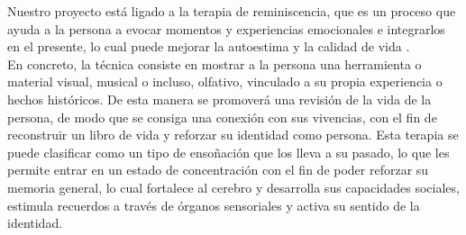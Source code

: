 Nuestro proyecto está ligado a la terapia de reminiscencia, que es un proceso que ayuda a la persona a evocar momentos y experiencias emocionales e integrarlos en el presente, lo cual puede mejorar la autoestima y la calidad de vida \citep{gonzalez2015terapia}.\\

En concreto, la técnica consiste en mostrar a la persona una herramienta o material visual, musical o incluso, olfativo, vinculado a su propia experiencia o hechos históricos. De esta manera se promoverá una revisión de la vida de la persona, de modo que se consiga una conexión con sus vivencias, con el fin de reconstruir un libro de vida y reforzar su identidad como persona.  Esta terapia se puede clasificar como un tipo de ensoñación que los lleva a su pasado, lo que les permite entrar en un estado de concentración con el fin de poder reforzar su memoria general, lo cual fortalece al cerebro y desarrolla sus capacidades sociales, estimula recuerdos a través de órganos sensoriales y activa su sentido de la identidad.\\



